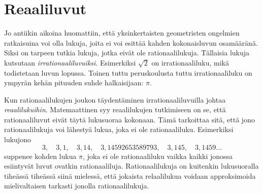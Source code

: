 \chapter{Reaaliluvut}

Jo antiikin aikoina huomattiin, että yksinkertaisten geometristen ongelmien ratkaisuina voi olla lukuja, joita ei voi esittää kahden kokonaisluvun osamääränä. Siksi on tarpeen tutkia lukuja, jotka  eivät ole rationaalilukuja. Tällaisia lukuja kutsutaan \emph{irrationaaliluvuiksi}. Esimerkiksi $\sqrt{2}$ on irrationaaliluku, mikä todistetaan luvun lopussa. Toinen tuttu peruskoulusta tuttu irrationaaliluku on ympyrän kehän pituuden suhde halkaisijaan: $\pi$. 

Kun rationaalilukujen joukon täydentäminen irrationaaliluvuilla johtaa \emph{reaalilukuihin}. Matemaattinen syy reaalilukujen tutkimiseen on se, että rationaaliluvut eivät täytä lukusuoraa kokonaan. Tämä tarkoittaa sitä, että jono rationaalilukuja voi lähestyä lukua, joka ei ole rationaaliluku. Esimerkiksi lukujono
\[
3, \quad 3,1, \quad 3,14, \quad 3,14592653589793, \quad 3,145, \quad 3,1459 \ldots
\]
suppenee kohden lukua $\pi$, joka ei ole rationaaliluku vaikka kaikki jonossa esiintyvät luvut ovatkin rationaaliluja. Rationaalilukuja on kuitenkin lukusuoralla tiheässä tiheässä siinä mielessä, että jokaista relaalilukua voidaan approksimoida mielivaltaisen tarkasti jonolla rationaalilukuja.



